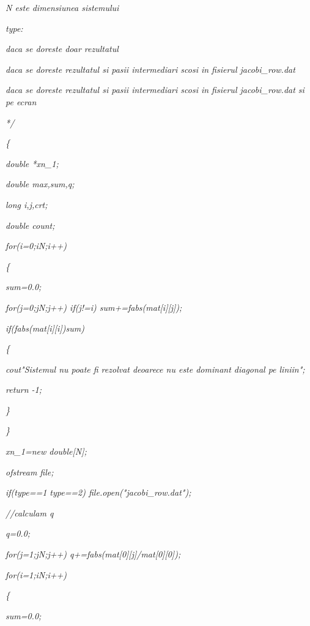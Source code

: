 \documentclass[a4paper,twoside]{book}
\begin{document}
\textit{\qquad N este dimensiunea sistemului}

\textit{\qquad type: }

\textit{ daca se doreste doar rezultatul}

\textit{ daca se doreste rezultatul si pasii intermediari scosi in
fisierul jacobi\_row.dat}

\textit{ daca se doreste rezultatul si pasii intermediari scosi in
fisierul jacobi\_row.dat si pe ecran}

\textit{*/}

\textit{\{}

\textit{\qquad double *xn\_1;}

\textit{\qquad double max,sum,q;}

\textit{\qquad long i,j,crt;}

\textit{\qquad double count;}

\textit{\qquad for(i=0;i\TEXTsymbol{<}N;i++)}

\textit{\qquad \{}

\textit{\qquad \qquad sum=0.0;}

\textit{\qquad \qquad for(j=0;j\TEXTsymbol{<}N;j++) if(j!=i)
sum+=fabs(mat[i][j]);}

\textit{\qquad \qquad if(fabs(mat[i][i])\TEXTsymbol{<}sum)}

\textit{\qquad \qquad \{}

\textit{\qquad \qquad \qquad cout\TEXTsymbol{<}\TEXTsymbol{<}"Sistemul nu
poate fi rezolvat deoarece nu este dominant diagonal pe linii\TEXTsymbol{%
\backslash}n";}

\textit{\qquad \qquad \qquad return -1;}

\textit{\qquad \qquad \}}

\textit{\qquad \}}

\textit{\qquad xn\_1=new double[N];}

\textit{\qquad ofstream file;}

\textit{\qquad if(type==1 \TEXTsymbol{\vert}\TEXTsymbol{\vert} type==2)
file.open("jacobi\_row.dat");}

\textit{\qquad //calculam q}

\textit{\qquad q=0.0;}

\textit{\qquad for(j=1;j\TEXTsymbol{<}N;j++) q+=fabs(mat[0][j]/mat[0][0]);}

\textit{\qquad for(i=1;i\TEXTsymbol{<}N;i++)}

\textit{\qquad \{}

\textit{\qquad \qquad sum=0.0;}
\end{document}
